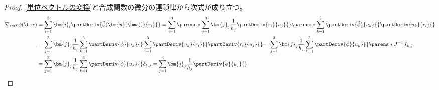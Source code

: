 \begin{proof}
                \ref{単位ベクトルの変換}と合成関数の微分の連鎖律から次式が成り立つ。
                \begin{align*}
                    \nabla_\vr\phi(\vr) &= \sum_{i=1}^3 \bm{i}_i\partDeriv{\tilde{\phi}(\bm{u}(\vr))}{r_i}{} = \sum_{i=1}^3\parens*{\sum_{j=1}^3 \bm{j}_j\frac{1}{h_j}\partDeriv{r_i}{u_j}{}}\parens*{\sum_{k=1}^3 \partDeriv{\tilde{\phi}}{u_k}{}\partDeriv{u_k}{r_i}{}} \\
                    &= \sum_{j=1}^3 \bm{j}_j\frac{1}{h_j}\sum_{k=1}^3 \partDeriv{\tilde{\phi}}{u_k}{}\sum_{i=1}^3 \partDeriv{u_k}{r_i}{}\partDeriv{r_i}{u_j}{} = \sum_{j=1}^3 \bm{j}_j\frac{1}{h_j}\sum_{k=1}^3 \partDeriv{\tilde{\phi}}{u_k}{}\parens*{J^{-1}J}_{k,j} \\
                    &= \sum_{j=1}^3 \bm{j}_j\frac{1}{h_j}\sum_{k=1}^3 \partDeriv{\tilde{\phi}}{u_k}{}\delta_{k,j} = \sum_{j=1}^3 \bm{j}_j\frac{1}{h_j}\partDeriv{\tilde{\phi}}{u_j}{}
                \end{align*}
            \end{proof}
